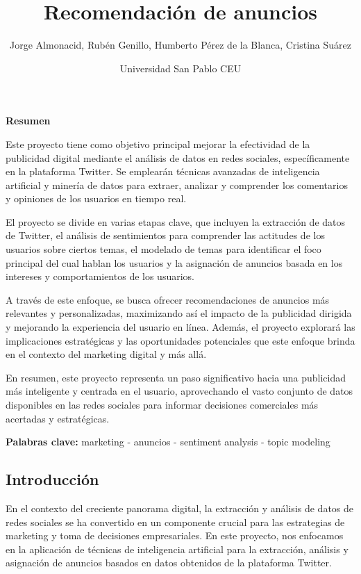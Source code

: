 \documentclass[
  letterpaper,
  DIV=11,
  numbers=noendperiod]{scrartcl}
\title{Recomendación de anuncios}
\author{Jorge Almonacid, Rubén Genillo, Humberto Pérez de la Blanca,
Cristina Suárez \and Universidad San Pablo CEU}
\date{}
\renewcommand*\contentsname{Tabla de contenidos}
\newcommand\contentsname{Tabla de contenidos}
\begin{document}
\maketitle

\renewcommand*\contentsname{Indice}
{
\hypersetup{linkcolor=}
\setcounter{tocdepth}{3}
\tableofcontents
}
\textbf{Resumen}

Este proyecto tiene como objetivo principal mejorar la efectividad de la
publicidad digital mediante el análisis de datos en redes sociales,
específicamente en la plataforma Twitter. Se emplearán técnicas
avanzadas de inteligencia artificial y minería de datos para extraer,
analizar y comprender los comentarios y opiniones de los usuarios en
tiempo real.

El proyecto se divide en varias etapas clave, que incluyen la extracción
de datos de Twitter, el análisis de sentimientos para comprender las
actitudes de los usuarios sobre ciertos temas, el modelado de temas para
identificar el foco principal del cual hablan los usuarios y la
asignación de anuncios basada en los intereses y comportamientos de los
usuarios.

A través de este enfoque, se busca ofrecer recomendaciones de anuncios
más relevantes y personalizadas, maximizando así el impacto de la
publicidad dirigida y mejorando la experiencia del usuario en línea.
Además, el proyecto explorará las implicaciones estratégicas y las
oportunidades potenciales que este enfoque brinda en el contexto del
marketing digital y más allá.

En resumen, este proyecto representa un paso significativo hacia una
publicidad más inteligente y centrada en el usuario, aprovechando el
vasto conjunto de datos disponibles en las redes sociales para informar
decisiones comerciales más acertadas y estratégicas.

\textbf{Palabras clave:} marketing - anuncios - sentiment analysis -
topic modeling

\newpage{}

\subsection{Introducción}\label{introducciuxf3n}

En el contexto del creciente panorama digital, la extracción y análisis
de datos de redes sociales se ha convertido en un componente crucial
para las estrategias de marketing y toma de decisiones empresariales. En
este proyecto, nos enfocamos en la aplicación de técnicas de
inteligencia artificial para la extracción, análisis y asignación de
anuncios basados en datos obtenidos de la plataforma Twitter.
\end{document}

